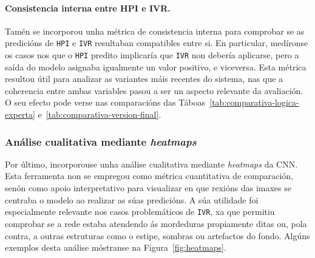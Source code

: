 \paragraph{Consistencia interna entre HPI e IVR.}
Tamén se incorporou unha métrica de consistencia interna para comprobar se as predicións de
\texttt{HPI} e \texttt{IVR} resultaban compatibles entre si. En particular, medíronse os casos nos
que o \texttt{HPI} predito implicaría que \texttt{IVR} non debería aplicarse, pero a saída do modelo
asignaba igualmente un valor positivo, e viceversa. Esta métrica resultou útil para analizar as
variantes máis recentes do sistema, nas que a coherencia entre ambas variables pasou a ser un aspecto
relevante da avaliación. O seu efecto pode verse nas comparacións das
Táboas~\ref{tab:comparativa-logica-experta} e~\ref{tab:comparativa-version-final}.

\subsubsection{Análise cualitativa mediante \textit{heatmaps}}
Por último, incorporouse unha análise cualitativa mediante \textit{heatmaps} da CNN. Esta ferramenta
non se empregou como métrica cuantitativa de comparación, senón como apoio interpretativo para
visualizar en que rexións das imaxes se centraba o modelo ao realizar as súas predicións. A súa
utilidade foi especialmente relevante nos casos problemáticos de \texttt{IVR}, xa que permitiu
comprobar se a rede estaba atendendo ás mordeduras propiamente ditas ou, pola contra, a outras
estruturas como o estipe, sombras ou artefactos do fondo. Algúns exemplos desta análise móstranse na
Figura~\ref{fig:heatmaps}.

